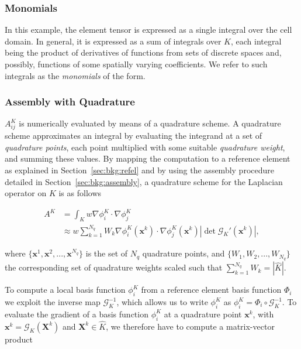 \subsubsection{Monomials}
\label{sec:bkg:monomials}
In this example, the element tensor is expressed as a single integral over the cell domain. In general, it is expressed as a sum of integrals over $K$, each integral being the product of derivatives of functions from sets of discrete spaces and, possibly, functions of some spatially varying coefficients. We refer to such integrals as the \textit{monomials} of the form. 

\subsubsection{Assembly with Quadrature}
$A_{ij}^K$ is numerically evaluated by means of a quadrature scheme. A quadrature scheme approximates an integral by evaluating the integrand at a set of {\em quadrature points}, each point multiplied with some suitable {\em quadrature weight}, and summing these values. By mapping the computation to a reference element as explained in Section~\ref{sec:bkg:refel} and by using the assembly procedure detailed in Section~\ref{sec:bkg:assembly}, a quadrature scheme for the Laplacian operator on $K$ is as follows

\begin{equation}
\begin{split}
A^K & = \int_K w \nabla \phi_i^K \cdot \nabla \phi_j^K \\
& \approx w \sum_{k=1}^{N_q} W_k \nabla \phi_i^K(\boldsymbol{x}^k) \cdot \nabla \phi_j^K (\boldsymbol{x}^k) | \operatorname{det} \mathcal{G}_K'(\boldsymbol{x}^k) |,
\end{split}
\end{equation} 

where $\lbrace \boldsymbol{x}^1, \boldsymbol{x}^2, ..., \boldsymbol{x}^{N_q} \rbrace$ is the set of $N_q$ quadrature points, and $\lbrace W_1, W_2, ..., W_{N_q} \rbrace$ the corresponding set of quadrature weights scaled such that $\sum_{k=1}^{N_q} W_k = |\hat{K}|$. 

To compute a local basis function $\phi_i^K$ from a reference element basis function $\Phi_i$ we exploit the inverse map $\mathcal{G}_K^{-1}$, which allows us to write $\phi_i^K$ as $\phi_i^K = \Phi_i \circ \mathcal{G}_K^{-1}$. To evaluate the gradient of a basis function $\phi_i^K$ at a quadrature point $\boldsymbol{x}^k$, with $\boldsymbol{x}^k = \mathcal{G}_K(\boldsymbol{X}^k)$ and $\boldsymbol{X}^k \in \hat{K}$, we therefore have to compute a matrix-vector product

